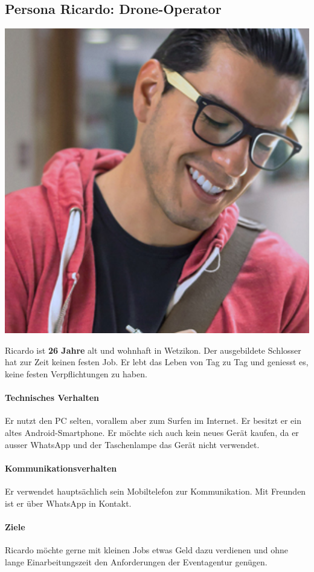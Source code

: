 \subsection{Persona Ricardo: Drone-Operator}
\begin{minipage}{0.25\textwidth}
\centering
	\includegraphics[width=1\textwidth]{images/persona-ricardo.jpg}
	\label{fig:ricardo}
\end{minipage}
\hfill %
\begin{minipage}{0.70\textwidth}
Ricardo ist \textbf{26 Jahre} alt und wohnhaft in Wetzikon. Der ausgebildete Schlosser hat zur Zeit keinen festen Job. Er lebt das Leben von Tag zu Tag und geniesst es, keine festen Verpflichtungen zu haben.
\paragraph{Technisches Verhalten}
Er nutzt den PC selten, vorallem aber zum Surfen im Internet. Er besitzt er ein altes Android-Smartphone. Er möchte sich auch kein neues Gerät kaufen, da er ausser WhatsApp und der Taschenlampe das Gerät nicht verwendet.
\paragraph{Kommunikationsverhalten}
Er verwendet hauptsächlich sein Mobiltelefon zur Kommunikation. Mit Freunden ist er über WhatsApp in Kontakt.
\paragraph{Ziele}
Ricardo möchte gerne mit kleinen Jobs etwas Geld dazu verdienen und ohne lange Einarbeitungszeit den Anforderungen der Eventagentur genügen.
\end{minipage}

